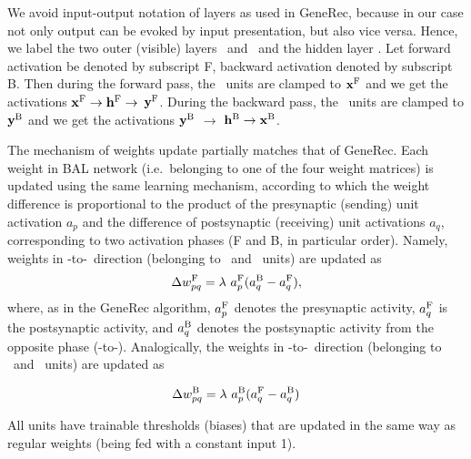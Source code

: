 We avoid input-output notation of layers as used in GeneRec, because in our case not only output can be evoked by input presentation, but also vice versa. Hence, we label the two outer (visible) layers \Bx \ and \By \ and the hidden layer \Bh. Let forward activation be denoted by subscript F, backward activation denoted by subscript B. Then during the forward pass, the \Bx \ units are clamped to ${\bf x}^{\rm F}$ and we get the activations ${\bf x}^{\rm F}\rightarrow{\bf h}^{\rm F}\rightarrow$ ${\bf y}^{\rm F}$. During the backward pass, the \By \ units are clamped to ${\bf y}^{\rm B}$ and we get the activations ${\bf y}^{\rm B}$ $\rightarrow$ ${\bf h}^{\rm B}\rightarrow{\bf x}^{\rm B}$.

The mechanism of weights update partially matches that of GeneRec. Each weight in BAL network (i.e.~belonging to one of the four weight matrices) is updated using the same learning mechanism, according to which the weight difference is proportional to the product of the presynaptic (sending) unit activation $a_p$ and the difference of postsynaptic (receiving) unit activations $a_q$, corresponding to two activation phases (F and B, in particular order). Namely, weights in \Bx-to-\By \ direction (belonging to \Bh \ and \By \ units) are updated as
\begin{equation}
\Delta w_{pq}^{\rm F} = \lambda \ a^{\rm F}_p(a^{\rm B}_q - a^{\rm F}_q),
\end{equation}
where, as in the GeneRec algorithm, $a^{\rm F}_p$ denotes the presynaptic activity, $a^{\rm F}_q$ is the postsynaptic activity, and $a^{\rm B}_q$ denotes the postsynaptic activity from the opposite phase (\By-to-\Bh). Analogically, the weights in \By-to-\Bx \ direction (belonging to \Bh \ and \Bx \ units) are updated as

\begin{equation}
\Delta w_{pq}^{\rm B} = \lambda \ a^{\rm B}_p(a^{\rm F}_q - a^{\rm B}_q)
\end{equation}

All units have trainable thresholds (biases) that are updated in the same way as regular weights (being fed with a constant input 1).

 



